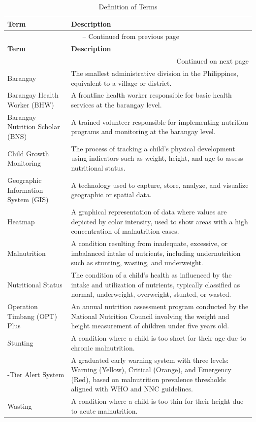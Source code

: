\documentclass[12pt, a4paper]{report}
\begin{document}
\vspace{0.3cm}
\begin{longtable}{p{4cm} p{10cm}}
    \caption{Definition of Terms} \label{tab:definition} \\
    \toprule
    \textbf{Term} & \textbf{Description} \\
    \midrule
    \endfirsthead
    \multicolumn{2}{c}{{\tablename\ \thetable{} -- Continued from previous page}} \\
    \toprule
    \textbf{Term} & \textbf{Description} \\
    \midrule
    \endhead
    \midrule
    \multicolumn{2}{r}{{Continued on next page}} \\
    \endfoot
    \bottomrule
    \endlastfoot
    Barangay & The smallest administrative division in the Philippines, equivalent to a village or district. \\
    \addlinespace
    Barangay Health Worker (BHW) & A frontline health worker responsible for basic health services at the barangay level. \\
    \addlinespace
    Barangay Nutrition Scholar (BNS) & A trained volunteer responsible for implementing nutrition programs and monitoring at the barangay level. \\
    \addlinespace
    Child Growth Monitoring & The process of tracking a child's physical development using indicators such as weight, height, and age to assess nutritional status. \\
    \addlinespace
    Geographic Information System (GIS) & A technology used to capture, store, analyze, and visualize geographic or spatial data. \\
    \addlinespace
    Heatmap & A graphical representation of data where values are depicted by color intensity, used to show areas with a high concentration of malnutrition cases. \\
    \addlinespace
    Malnutrition & A condition resulting from inadequate, excessive, or imbalanced intake of nutrients, including undernutrition such as stunting, wasting, and underweight. \\
    \addlinespace
    Nutritional Status & The condition of a child's health as influenced by the intake and utilization of nutrients, typically classified as normal, underweight, overweight, stunted, or wasted. \\
    \addlinespace
    Operation Timbang (OPT) Plus & An annual nutrition assessment program conducted by the National Nutrition Council involving the weight and height measurement of children under five years old. \\
    \addlinespace
    Stunting & A condition where a child is too short for their age due to chronic malnutrition. \\
    \addlinespace
    3-Tier Alert System & A graduated early warning system with three levels: Warning (Yellow), Critical (Orange), and Emergency (Red), based on malnutrition prevalence thresholds aligned with WHO and NNC guidelines. \\
    \addlinespace
    Wasting & A condition where a child is too thin for their height due to acute malnutrition. \\
\end{longtable}
\end{document}
